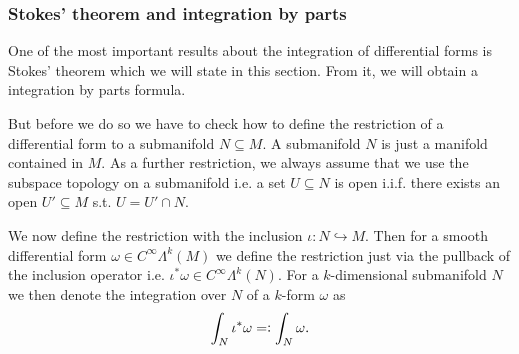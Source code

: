 \documentclass[../master_thesis.tex]{subfiles}
\begin{document}
\subsubsection{Stokes' theorem and integration by parts} 

One of the most important results about the integration of differential forms
is Stokes' theorem which we will state in this section. From it, we will 
obtain a integration by parts formula.

But before we do so we have to check how to define the restriction of a
differential form to a submanifold $N \subseteq M$. A submanifold $N$ 
is just a manifold contained in $M$. As a further restriction, we always assume
that we use the subspace topology on a submanifold i.e. a set $U \subseteq N$ 
is open i.i.f. there exists an open $U' \subseteq M$ s.t. $U = U' \cap N$.

We now define the restriction with the inclusion $\iota: N \hookrightarrow M$. Then for a 
smooth differential form $\omega \in C^\infty \Lambda^k (M)$ we define 
the restriction just via the pullback of the inclusion operator i.e. 
$\iota^* \omega \in C^\infty \Lambda^k(N)$. 
For a $k$-dimensional submanifold $N$ we then denote the integration over $N$ of a 
$k$-form $\omega$ as
\begin{align*}
    \int_N \iota^*\omega =\vcentcolon \int_N \omega.
\end{align*} 
\end{document}

